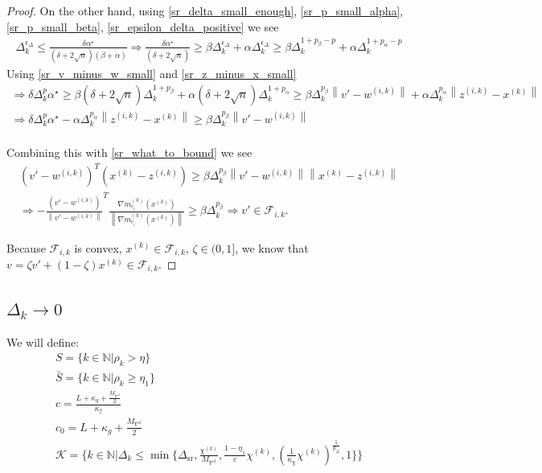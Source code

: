 \documentclass{article}
\theoremstyle{case}
\newcommand{\chik}{{\chi^{(k)}}}
\newcommand{\dk}{\Delta_k}
\newcommand{\dsr}{{\Delta_{\text{sr}}}}
\newcommand{\fik}{{\mathcal F_{i, k}}}
\newcommand{\gmcik}{{\nabla m_{c_i}^{(k)}\left(\xk\right)}}
\newcommand{\maxhessian}{{M_{\nabla^2}}}
\newcommand{\minanglealpha}{{ \alpha^{\star} }}
\newcommand{\naturals}{\mathbb N}
\newcommand{\rk}{\rho_k}
\newcommand{\wik}{{w^{(i, k)}}}
\newcommand{\xk}{{x^{(k)}}}
\newcommand{\zik}{{z^{(i, k)}}}
\begin{document}
\begin{proof}
On the other hand, using \cref{sr_delta_small_enough}, \cref{sr_p_small_alpha}, \cref{sr_p_small_beta}, \cref{sr_epsilon_delta_positive} we see
\begin{align*}
\dk^{\epsilon_{\Delta}} \le \frac{\delta \minanglealpha}{\left(\delta + 2\sqrt{n}\right) \left(\beta +\alpha\right)} 
\Longrightarrow\frac{ \delta \minanglealpha }{\left(\delta + 2\sqrt{n}\right)} \ge \beta\dk^{\epsilon_{\Delta}} + \alpha\dk^{\epsilon_{\Delta}} 
\ge \beta \dk^{1 + p_{\beta} - p} + \alpha \dk ^{1 + p_{\alpha} - p}
\end{align*}
Using \cref{sr_v_minus_w_small} and \cref{sr_z_minus_x_small}
\begin{align*}
\Longrightarrow \delta\dk^{p} \minanglealpha  \ge \beta \left(\delta + 2\sqrt{n}\right) \dk^{1 + p_{\beta}} + \alpha\left(\delta + 2\sqrt{n}\right)  \dk ^{1 + p_{\alpha}}
\ge \beta \dk^{p_{\beta}}\left\|v' - \wik\right\| + \alpha \dk ^{p_{\alpha}} \left\|\zik - \xk\right\|\\
\Longrightarrow \delta\dk^{p} \minanglealpha - \alpha \dk ^{p_{\alpha}} \left\|\zik - \xk\right\|  \ge \beta \dk^{p_{\beta}}\left\|v' - \wik\right\| \\
\end{align*}

Combining this with \cref{sr_what_to_bound} we see
\begin{align*}
\left(v' - \wik \right)^T\left(\xk - \zik \right) \ge \beta \dk^{p_{\beta}}\left\|v' - \wik\right\| \left\|\xk - \zik\right\| \\
\Longrightarrow -\frac {\left(v' - \wik \right)}{\left\|v' - \wik \right\|}^T\frac{\gmcik}{\left\|\gmcik\right\|}\ge\beta \dk^{p_{\beta}} 
\Longrightarrow v' \in \fik.
\end{align*}

Because $\fik$ is convex, $\xk \in \fik$, $\zeta \in (0, 1]$, we know that $v = \zeta v' + (1 - \zeta)\xk\in\fik$.
\end{proof}



\subsection{$\dk \to 0$}

We will define:
\begin{align}
S = \{k \in \naturals | \rk > \eta \} \\
\bar{S} = \{k \in \naturals | \rk \ge \eta_1 \} \\
c = \frac{L + \kappa_{g} + \frac {\maxhessian} 2}{\kappa_f} \\
c_0 = L + \kappa_{g} + \frac {\maxhessian} 2 \\
\mathcal K = \big \{ k \in \naturals | \dk \le \min \{ \dsr, \frac {\chik}{\maxhessian}, \frac{1-\eta_1}{c}\chik, \left(\frac 1 {\kappa_{\chi}}  \chik\right)^{\frac 1 {p_{\Delta}}}, 1 \} \big \} \label{define_mathcal_k}
\end{align}
\end{document}
